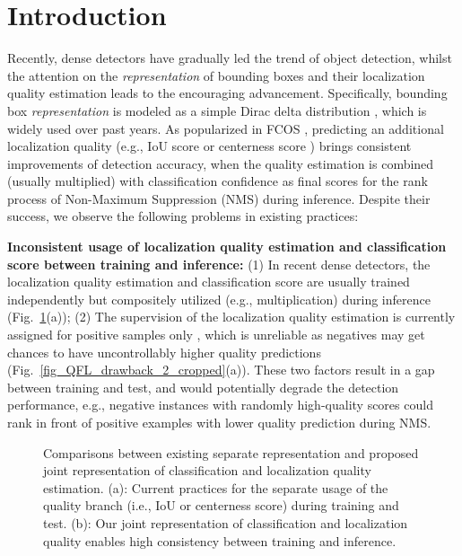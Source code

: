 \documentclass{article}
\begin{document}
\section{Introduction}
\label{intro}

Recently, dense detectors have gradually led the trend of object detection, whilst the attention on the \emph{representation} of bounding boxes and their localization quality estimation leads to the encouraging advancement. Specifically, bounding box \emph{representation} is modeled as a simple Dirac delta distribution \cite{he2019bounding,lin2017focal,zhang2019freeanchor,tian2019fcos,zhang2019bridging}, which is widely used over past years. As popularized in FCOS \cite{tian2019fcos}, predicting an additional localization quality (e.g., IoU score \cite{wu2020iou} or centerness score \cite{tian2019fcos}) brings consistent improvements of detection accuracy, when the quality estimation is combined (usually multiplied) with classification confidence as final scores \cite{jiang2018acquisition,huang2019mask,tian2019fcos,wu2020iou,zhu2019iou} for the rank process of Non-Maximum Suppression (NMS) during inference. Despite their success, we observe the following problems in existing practices: 


\textbf{Inconsistent usage of localization quality estimation and classification score between training and inference:}  (1) In recent dense detectors, the localization quality estimation and classification score are usually trained independently but compositely utilized (e.g., multiplication) during inference \cite{tian2019fcos,wu2020iou} (Fig.~\ref{fig_QFL_drawback_1_cropped}(a));
(2) The supervision of the localization quality estimation is currently assigned for positive samples only \cite{jiang2018acquisition,huang2019mask,tian2019fcos,wu2020iou,zhu2019iou}, which is unreliable as negatives may get chances to have uncontrollably higher quality predictions (Fig.~\ref{fig_QFL_drawback_2_cropped}(a)). These two factors result in a gap between training and test, and would potentially degrade the detection performance, e.g., negative instances with randomly high-quality scores could rank in front of positive examples with lower quality prediction during NMS.




\begin{figure}[t]
	\begin{center}
		\setlength{\fboxrule}{0pt}
	\end{center}	
	\vspace{-12pt}
	\caption{Comparisons between existing separate representation and proposed joint representation of classification and localization quality estimation. (a): Current practices \cite{jiang2018acquisition,tian2019fcos,wu2020iou,zhu2019iou,zhang2019bridging} for the separate usage of the quality branch (i.e., IoU or centerness score) during training and test. (b): Our joint representation of classification and localization quality enables high consistency between training and inference.}
	\label{fig_QFL_drawback_1_cropped}
	\vspace{-16pt}
\end{figure}
\end{document}
